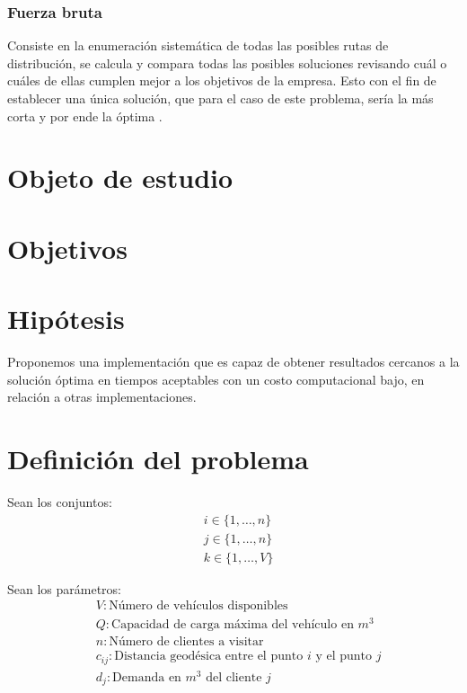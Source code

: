 \documentclass[journal]{IEEEtran}
\begin{document}
            \subsubsection{Fuerza bruta}
            
                Consiste en la enumeración sistemática de todas las posibles rutas de distribución, se calcula y compara todas las posibles soluciones revisando cuál o cuáles de ellas cumplen mejor a los objetivos de la empresa. Esto con el fin de establecer una única solución, que para el caso de este problema, sería la más corta y por ende la óptima \cite{trevelingProb}.
    
    \section{Objeto de estudio}

    \section{Objetivos}

    \section{Hipótesis} \label{sec:hyp}
            
        Proponemos una implementación que es capaz de obtener resultados cercanos a la solución óptima en tiempos aceptables con un costo computacional bajo, en relación a otras implementaciones.

    \section{Definición del problema} \label{definition}
        
        Sean los conjuntos:
        \begin{align*}
            & i \in \{1, \dots, n \} \\
            & j \in \{1, \dots, n \} \\
            & k \in \{1, \dots, V \}
        \end{align*}
        
        Sean los parámetros:
        \begin{align*}
            & V: \text{Número de vehículos disponibles} \\
            & Q: \text{Capacidad de carga máxima del vehículo en } m^3 \\
            & n: \text{Número de clientes a visitar} \\
            & c_{ij}: \text{Distancia geodésica entre el punto } i \text{ y el punto } j \\
            & d_j: \text{Demanda en } m^3 \text{ del cliente } j 
        \end{align*}
        
\end{document}
